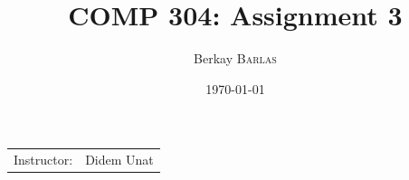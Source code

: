\documentclass{article}
\title{COMP 304: Assignment 3} %
\author{Berkay \textsc{Barlas}} %
\date{\today} %
\begin{document}
\maketitle %

\begin{center}
\begin{tabular}{l r}
Instructor: & Didem Unat %
\end{tabular}
\end{center}


\end{document}

